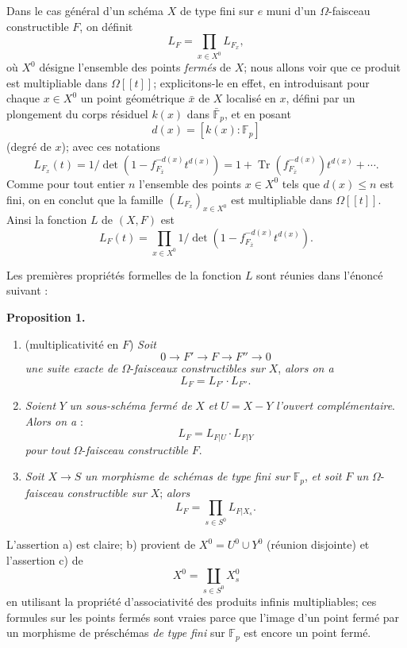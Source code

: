 \documentclass[11pt]{article}
\newenvironment{statement}[1]{\par\medskip\noindent\textbf{#1.}\ }{\par\medskip}
\providecommand{\Tr}{\operatorname{Tr}}
\providecommand{\Tr}{\operatorname{Tr}}
\providecommand{\Tr}{\operatorname{Tr}}
\providecommand{\Tr}{\operatorname{Tr}}
\providecommand{\Tr}{\operatorname{Tr}}
\begin{document}
Dans le cas
général d'un schéma $X$ de type fini sur $e$ muni d'un $\Omega$-faisceau constructible $F$, on définit
\[
L_F=\prod_{x\in X^0}L_{F_x},
\]
où $X^0$ désigne l'ensemble des points \emph{fermés} de $X$; nous allons voir que ce produit est multipliable dans $\Omega[[t]]$; explicitons-le en effet, en introduisant pour chaque $x\in X^0$ un point géométrique $\bar x$ de $X$ localisé en $x$, défini par un plongement du corps résiduel $k(x)$ dans $\bar{\mathbb F}_p$, et en posant
\[
d(x)=[k(x):\mathbb F_p]
\]
(degré de $x$); avec ces notations
\[
L_{F_x}(t)=1/\det(1-f_{F_{\bar x}}^{-d(x)}t^{d(x)})
 =1+\Tr(f_{F_{\bar x}}^{-d(x)})t^{d(x)}+\cdots .
\]
Comme pour tout entier $n$ l'ensemble des points $x\in X^0$ tels que $d(x)\le n$ est fini, on en conclut que la famille $(L_{F_x})_{x\in X^0}$ est multipliable dans $\Omega[[t]]$. Ainsi la fonction $L$ de $(X,F)$ est
\[
L_F(t)=\prod_{x\in X^0}1/\det(1-f_{F_{\bar x}}^{-d(x)}t^{d(x)}).
\]

Les premières propriétés formelles de la fonction $L$ sont réunies dans l'énoncé suivant :

\begin{statement}{Proposition 1}
\begin{enumerate}[label=\alph*)]
\item (multiplicativité en $F$) \emph{Soit}
\[
0\longrightarrow F'\longrightarrow F\longrightarrow F''\longrightarrow0
\]
\emph{une
suite exacte de} $\Omega$-\emph{faisceaux constructibles sur} $X$, \emph{alors on a}
\[
L_F=L_{F'}\cdot L_{F''}.
\]
\item \emph{Soient} $Y$ \emph{un sous-schéma fermé de} $X$ \emph{et} $U=X-Y$ \emph{l'ouvert complémentaire}. \emph{Alors on a} :
\[
L_F=L_{F|U}\cdot L_{F|Y}
\]
\emph{pour tout} $\Omega$-\emph{faisceau constructible} $F$.
\item \emph{Soit} $X\to S$ \emph{un morphisme de schémas de type fini sur} $\mathbb F_p$, \emph{et soit} $F$ \emph{un} $\Omega$-\emph{faisceau constructible sur} $X$; \emph{alors}
\[
L_F=\prod_{s\in S^0}L_{F|X_s}.
\]
\end{enumerate}
\end{statement}

L'assertion a) est claire; b) provient de $X^0=U^0\cup Y^0$ (réunion disjointe) et l'assertion c) de
\[
X^0=\coprod_{s\in S^0}X_s^0
\]
en utilisant la propriété d'associativité des produits infinis multipliables; ces formules sur les points fermés sont vraies parce que l'image d'un point fermé par un morphisme de préschémas \emph{de type fini} sur $\mathbb F_p$ est encore un point fermé.
\end{document}
